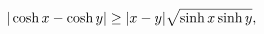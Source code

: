 \[|\mathop{\cosh\/}\nolimits x-\mathop{\cosh\/}\nolimits y|\geq|x-y|\sqrt{%
\mathop{\sinh\/}\nolimits x\mathop{\sinh\/}\nolimits y},\]